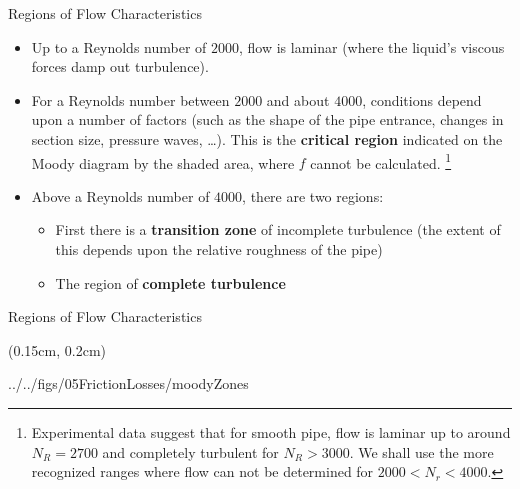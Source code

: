 \documentclass[9pt,xcolor={svgnames, x11names},professionalfonts, mathserif]{beamer}
\begin{document}
\begin{frame}{Regions of Flow Characteristics}
	\begin{mini}{
			\begin{itemize}
				\item Up to a Reynolds number of $2000$, flow is laminar \newline(where the liquid's viscous forces damp out turbulence).\parb
				\item For a Reynolds number between $2000$ and about $4000$, conditions depend upon a number of factors (such as the
				      shape of the pipe entrance, changes in section size, pressure waves, \ldots). This is the \textbf{critical region} indicated
				      on the Moody diagram by the shaded area, where $f$ cannot be calculated.
				      \footnote{Experimental data suggest that for smooth pipe, flow is laminar up to around $N_R=2700$ and completely
				      	turbulent for $N_R > 3000$. We shall use the more recognized ranges where flow can not be determined for $2000 <
				      	N_r < 4000$.} \parb
				\item Above a Reynolds number of $4000$, there are two regions:
				      
				      \begin{itemize}
				      	\item First there is a \textbf{transition zone} of incomplete turbulence (the extent of this depends upon the relative roughness of
				      	      the pipe) \parm
				      	\item The region of \textbf{complete turbulence}
				      \end{itemize}
			\end{itemize}
		}
	\end{mini}
\end{frame}


\begin{frame}{Regions of Flow Characteristics}
	\begin{textblock*}{1\columnwidth}(0.15cm, 0.2cm)
		\begin{cfig}[0.6]{../../figs/05FrictionLosses/moodyZones}\end{cfig}
	\end{textblock*}
\end{frame}
\end{document}
